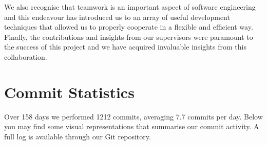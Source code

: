 \documentclass[a4paper,11pt]{article}
\begin{document}
We also recognise that teamwork is an important aspect of software engineering and this endeavour has
introduced us to an array of useful development techniques that allowed us to properly cooperate in a flexible
and efficient way. Finally, the contributions and insights from our supervisors were paramount to the success of
this project and we have acquired invaluable insights from this collaboration.







\clearpage

{}

\clearpage
\appendix
\section{Commit Statistics}

Over 158 days we performed 1212 commits, averaging 7.7 commits per day. Below you may find some visual representations that summarise our commit activity. A full log is available through our Git repository.
\end{document}
